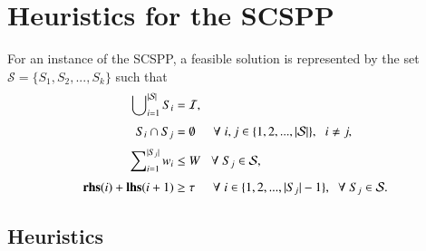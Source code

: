 \documentclass{elsarticle}
\begin{document}
\section{Heuristics for the SCSPP}
\label{sec:scspp}
For an instance of the SCSPP, a feasible solution is represented by the set $\mathcal{S} = \{S_1, S_2, ..., S_k\}$ such that
\begin{subequations}
	\begin{align}
	\bigcup\nolimits_{i=1}^{|\mathcal{S}|} S_i &= \mathcal{I}, \label{eqn:packall}\\[3pt]
	S_i \cap S_j &= \emptyset \hspace{5mm} \forall \hspace{1mm} i, j \in \{1, 2, ..., |\mathcal{S}|\}, \hspace{2mm} i \neq j, \label{eqn:nooverlap} \\[3pt]
	\sum\nolimits_{i=1}^{|S_j|}w_i & \leq W \hspace{3mm} \forall \hspace{1mm} S_j \in \mathcal{S}, \label{eqn:capacity} \\[3pt]
	\textup{\textbf{rhs}}(i) + \textup{\textbf{lhs}}(i+1) &\geq \tau \hspace {5mm} \forall \hspace{1mm} i \in \{1, 2, ..., |S_j|-1\}, \hspace{2mm} \forall \hspace{1mm} S_j \in \mathcal{S}. \label{eqn:vscstrip}
	\end{align}
\end{subequations}

\subsection{Heuristics}
\label{sub:heuristics}
\end{document}
